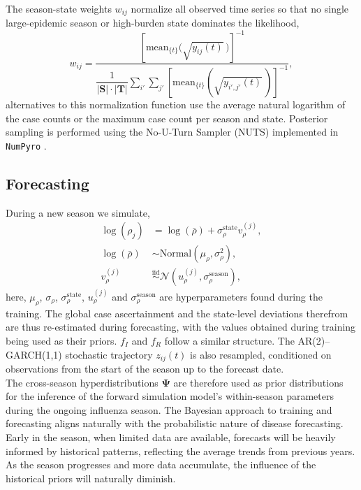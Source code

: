\documentclass[11pt]{article}
\newcommand{\Normal}{\text{Normal}}
\begin{document}
The season-state weights $w_{ij}$ normalize all observed time series so that no single large-epidemic season or high-burden state dominates the likelihood,
\begin{equation}
    w_{ij} = \frac{\left[ \text{mean}_{\{t\}} \big( \sqrt{y_{ij}(t)}\, \big) \right]^{-1}}{\dfrac{1}{|\bm{S}| \cdot |\bm{T}|} \displaystyle\sum_{i'}\sum_{j'}  \left[ \text{mean}_{\{t\}} \left( \sqrt{y_{i',j'}(t)}\, \right) \right]^{-1}},
\end{equation}
alternatives to this normalization function use the average natural logarithm of the case counts or the maximum case count per season and state. Posterior sampling is performed using the No-U-Turn Sampler (NUTS) \citep{hoffman2011} implemented in \texttt{NumPyro} \citep{phan2019,bingham2019}.
 
\subsection{Forecasting}

During a new season we simulate,
\begin{align}
\log \left( \rho_j \right) &= \log \left( \bar{\rho} \right) + \sigma_{\rho}^{\text{state}} v^{(j)}_{\rho}, \nonumber \\
\log\left( \bar{\rho} \right) & \sim \Normal (\mu_{\rho}, \sigma_{\rho}^2), \nonumber \\
v_{\rho}^{(j)} &\overset{\mathrm{iid}}{\sim} \mathcal{N} \left(u_{\rho}^{(j)}, \sigma_{\rho}^{\text{season}} \right),
\end{align}
here, $\mu_{\rho}$, $\sigma_{\rho}$, $\sigma_{\rho}^{\text{state}}$, $u^{(j)}_{\rho}$ and $\sigma^{\text{season}}_{\rho}$ are hyperparameters found during the training. The global case ascertainment and the state-level deviations therefrom are thus re-estimated during forecasting, with the values obtained during training being used as their priors. $f_I$ and $f_R$ follow a similar structure. The AR(2)--GARCH(1,1) stochastic trajectory $z_{ij}(t)$ is also resampled, conditioned on observations from the start of the season up to the forecast date.\\

The cross-season hyperdistributions $\bm{\Psi}$ are therefore used as prior distributions for the inference of the forward simulation model's within-season parameters during the ongoing influenza season. The Bayesian approach to training and forecasting aligns naturally with the probabilistic nature of disease forecasting. Early in the season, when limited data are available, forecasts will be heavily informed by historical patterns, reflecting the average trends from previous years. As the season progresses and more data accumulate, the influence of the historical priors will naturally diminish. 
\end{document}
